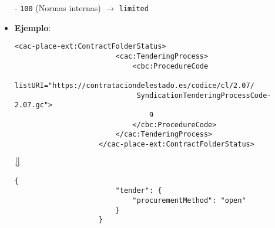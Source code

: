 \begin{itemize}
                    \subitem - \texttt{100} (Normas internas) $\rightarrow$ \texttt{limited}
            \item \textbf{Ejemplo}: \\
                \begin{lstlisting}[language=lXML]
                    <cac-place-ext:ContractFolderStatus>
                        <cac:TenderingProcess>
                            <cbc:ProcedureCode
                             listURI="https://contrataciondelestado.es/codice/cl/2.07/
                             SyndicationTenderingProcessCode-2.07.gc">
                                9
                            </cbc:ProcedureCode>
                        </cac:TenderingProcess>
                    </cac-place-ext:ContractFolderStatus>
                \end{lstlisting}
                
                \begin{center}
                    $\big\Downarrow$
                \end{center}
                
                \begin{lstlisting}[language=lJSON]
                    {
                        "tender": {
                            "procurementMethod": "open"
                        }
                    }
                \end{lstlisting}
        \end{itemize}
        

